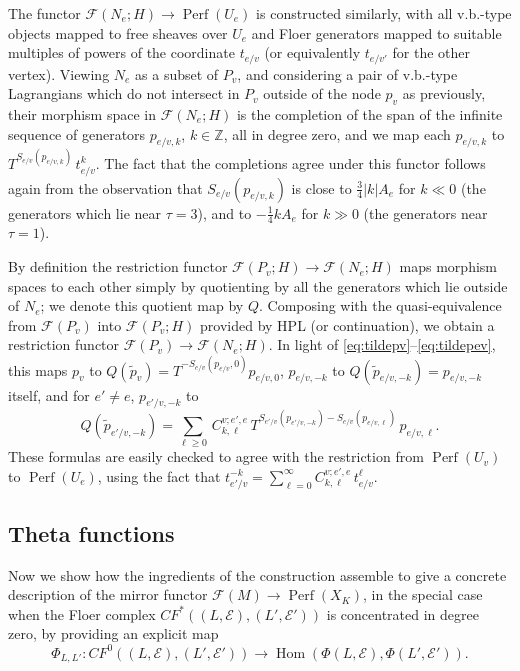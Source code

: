 \documentclass[11pt,leqno]{amsart}
\numberwithin{equation}{section}
\def\Z{\mathbb{Z}}
\def\Hom{\operatorname{Hom}}
\newcommand{\cF}{{\mathcal F}}
\newcommand{\cE}{{\mathcal E}}
\newcommand{\Perf}{\operatorname{Perf}}
\begin{document}
The functor $\cF(N_e;H)\to \Perf(U_e)$ is constructed similarly, with all
v.b.-type objects mapped to free sheaves over $U_e$ and Floer generators
mapped to suitable multiples of powers of the coordinate $t_{e/v}$ (or
equivalently $t_{e/v'}$ for the other vertex). Viewing $N_e$ as a subset of
$P_v$, and considering a pair of v.b.-type Lagrangians which do not intersect in $P_v$
outside of the node $p_v$ as previously, their morphism space in
$\cF(N_e;H)$ is the completion of the span of the infinite sequence of generators
$p_{e/v,k}$, $k\in\Z$, all in degree zero, and we map each $p_{e/v,k}$ to
$T^{S_{e/v}(p_{e/v,k})}\,t_{e/v}^k$. The fact that the completions agree
under this functor follows again from the observation that
$S_{e/v}(p_{e/v,k})$ is close to $\frac34 |k| A_e$ for $k\ll 0$ (the generators
which lie near $\tau=3$), and to $-\frac14 k A_e$ for $k\gg 0$ (the generators near $\tau=1$).

By definition the restriction functor $\cF(P_v;H)\to \cF(N_e;H)$ maps
morphism spaces to each other simply by quotienting by all
the generators which lie outside of $N_e$; we denote this quotient map by $Q$. Composing with the
quasi-equivalence from $\cF(P_v)$ into $\cF(P_v;H)$ provided by HPL (or
continuation), we obtain a restriction functor $\cF(P_v)\to \cF(N_e;H)$.
In light of \eqref{eq:tildepv}--\eqref{eq:tildepev}, this maps
$p_v$ to $Q(\tilde{p}_v)=T^{-S_{e/v}(p_{e/v},0)} p_{e/v,0}$, 
$p_{e/v,-k}$ to $Q(\tilde{p}_{e/v,-k})=p_{e/v,-k}$ itself, and for $e'\neq e$, $p_{e'/v,-k}$ to 
$$Q(\tilde{p}_{e'/v,-k})=\sum_{\ell\geq 0} \,C^{v;e',e}_{k,\ell}\,
T^{S_{e'/v}(p_{e'/v,-k})-S_{e/v}(p_{e/v,\ell})}\,p_{e/v,\ell}.$$
These formulas are easily checked to agree with the restriction from $\Perf(U_v)$ to
$\Perf(U_e)$, using the fact that $t_{e'/v}^{-k}=\sum_{\ell=0}^\infty C_{k,\ell}^{v;e',e}\, t_{e/v}^\ell$.

\subsection{Theta functions}\label{ss:theta}
Now we show how the ingredients of the construction assemble to give a concrete
description of the mirror functor $\cF(M)\to \Perf(X_K)$, in the special case when the Floer complex $CF^*((L,\cE),(L',\cE'))$ is concentrated in degree zero,
by providing an explicit map 
\begin{equation}\label{eq:theta}\Phi_{L,L'}:CF^0((L,\cE),(L',\cE'))\to \Hom(\Phi(L,\cE),\Phi(L',\cE')).\end{equation}
\end{document}

